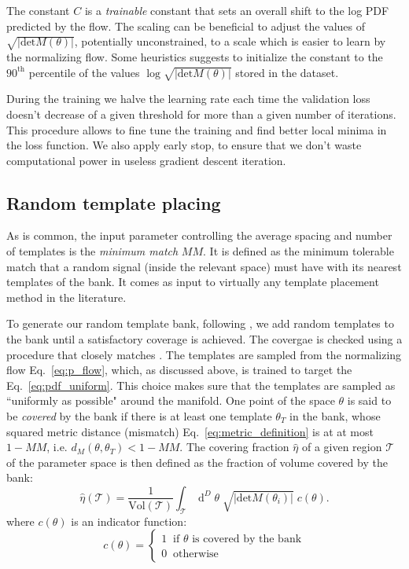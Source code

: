 \documentclass[twocolumn,showpacs,preprintnumbers,nofootinbib,prd,
superscriptaddress,10pt]{revtex4-2}
\newcommand{\dvol}[2]{\ensuremath{\operatorname{d}^{#2}\!{#1}}}
\begin{document}
The constant $C$ is a {\it trainable} constant that sets an overall shift to the log PDF predicted by the flow. The scaling can be beneficial to adjust the values of $\sqrt{|\text{det}M(\theta)|}$, potentially unconstrained, to a scale which is easier to learn by the normalizing flow.
Some heuristics suggests to initialize the constant to the $90^\text{th}$ percentile of the values $\log \sqrt{|\text{det}M(\theta)|}$ stored in the dataset.

During the training we halve the learning rate each time the validation loss doesn't decrease of a given threshold for more than a given number of iterations. This procedure allows to fine tune the training and find better local minima in the loss function. We also apply early stop, to ensure that we don't waste computational power in useless gradient descent iteration.

\subsection{Random template placing} \label{sec:template_placing}

As is common, the input parameter controlling the average spacing and number of templates is the {\it minimum match} $MM$. It is defined as the minimum tolerable match that a random signal (inside the relevant space) must have with its nearest templates of the bank. It comes as input to virtually any template placement method in the literature.

To generate our random template bank, following \cite{Messenger:2008ta}, we add random templates to the bank until a satisfactory coverage is achieved. The covergae is checked using a procedure that closely matches \cite{Coogan:2022qxs}.
The templates are sampled from the normalizing flow Eq.~\eqref{eq:p_flow}, which, as discussed above, is trained to target the Eq.~\eqref{eq:pdf_uniform}. This choice makes sure that the templates are sampled as ``uniformly as possible" around the manifold.
One point of the space $\theta$ is said to be {\it covered} by the bank if there is at least one template $\theta_T$ in the bank, whose squared metric distance (mismatch) Eq.~\eqref{eq:metric_definition} is at at most $1 - MM$, i.e. $d_M(\theta, \theta_T)<1 - MM$.
The covering fraction $\hat{\eta}$ of a given region $\mathcal{T}$ of the parameter space is then defined as the fraction of volume covered by the bank:
\begin{equation}\label{eq:coverage}
	\hat{\eta}(\mathcal{T}) = \frac{1}{\text{Vol}(\mathcal{T})} \int_\mathcal{T} \dvol{\theta}{D} \; \sqrt{|\text{det}M(\theta_i)|} \; c(\theta).
\end{equation}
where $c(\theta)$ is an indicator function:
\begin{equation}
	c(\theta) = \left\{
                \begin{array}{ll}
                  1 \;\; \text{if $\theta$ is covered by the bank}\\
                  0 \;\; \text{otherwise}
                \end{array}
              \right.
\end{equation}
\end{document}
